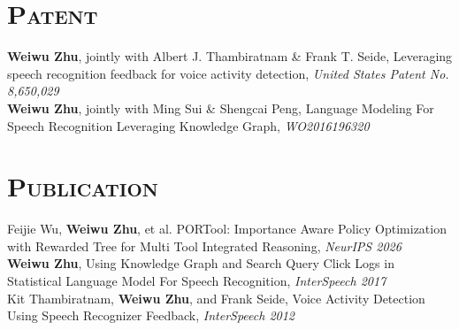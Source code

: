 \begin{resume}



\vspace*{-4pt}
\section{\textsc{Patent}}
\textbf{Weiwu Zhu}, jointly with Albert J. Thambiratnam \& Frank T. Seide, Leveraging speech recognition feedback for voice activity detection, {\it United States Patent No. 8,650,029}\\
\vspace*{-6pt}
\newline
\textbf{Weiwu Zhu}, jointly with Ming Sui \& Shengcai Peng, Language Modeling For Speech Recognition Leveraging Knowledge Graph, {\it WO2016196320}\\

\vspace*{-14pt}
\section{\textsc{Publication}}
Feijie Wu, \textbf{Weiwu Zhu}, et al. PORTool: Importance Aware Policy Optimization with Rewarded Tree for Multi Tool Integrated Reasoning, {\it NeurIPS 2026}\\
\vspace*{-6pt}
\newline
\textbf{Weiwu Zhu}, Using Knowledge Graph and Search Query Click Logs in Statistical Language Model For Speech Recognition, {\it InterSpeech 2017}\\
\vspace*{-6pt}
\newline
Kit Thambiratnam, \textbf{Weiwu Zhu}, and Frank Seide, Voice Activity Detection Using Speech Recognizer Feedback, {\it InterSpeech 2012}\\



\end{resume}
